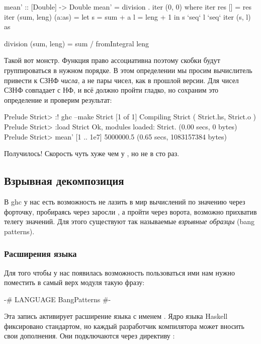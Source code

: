 \begin{code}
mean' :: [Double] -> Double
mean' = division . iter (0, 0)
    where iter res          []      = res
          iter (sum, leng)  (a:as)  = 
                let s = sum  + a
                    l = leng + 1
                in  s `seq` l `seq` iter (s, l) as
          
          division (sum, leng) = sum / fromIntegral leng
\end{code}

Такой вот монстр. Функция  право ассоциативна
поэтому скобки будут группироваться в нужном порядке.
В этом определении мы просим вычислитель привести
к СЗНФ \emph{числа}, а не пары чисел, как в прошлой версии.
Для чисел СЗНФ совпадает с НФ, и всё должно пройти гладко,
но сохраним это определение и проверим результат:

\begin{code}
Prelude Strict> :! ghc --make Strict
[1 of 1] Compiling Strict           ( Strict.hs, Strict.o )
Prelude Strict> :load Strict
Ok, modules loaded: Strict.
(0.00 secs, 0 bytes)
Prelude Strict> mean' [1 .. 1e7]
5000000.5
(0.65 secs, 1083157384 bytes)
\end{code}

Получилось! Скорость чуть хуже чем у , но не в сто раз.

\subsection{Взрывная декомпозиция}

В ghc у нас есть возможность не лазить в мир 
вычислений по значению через форточку, пробираясь через заросли
, а пройти через ворота, возможно прихватив телегу
значений. Для этого существуют так называемые \emph{взрывные образцы}
(bang patterns).

\subsubsection{Расширения языка}

Для того чтобы у нас появилась возможность пользоваться ими
нам нужно поместить в самый верх модуля такую фразу:

\begin{code}
{-# LANGUAGE BangPatterns #-}
\end{code}

Эта запись активирует расширение языка с именем .
Ядро языка Haskell фиксировано стандартом, но каждый разработчик
компилятора может вносить свои дополнения. Они подключаются 
через директиву :

